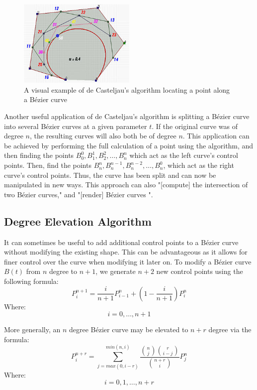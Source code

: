 \documentclass{article}
\begin{document}
\begin{figure}[h]
    \centering
    \includegraphics[width=0.5\textwidth]{de-casteljau.jpg}
    \caption{A visual example of de Casteljau's algorithm locating a point along a Bézier curve}
    \label{fig2:de-casteljau}
\end{figure}

Another useful application of de Casteljau's algorithm is splitting a Bézier curve into several Bézier curves at a given parameter $t$. If the original curve was of degree $n$, the resulting curves will also both be of degree $n$. This application can be achieved by performing the full calculation of a point using the algorithm, and then finding the points $B_0^0, B_1^1, B_2^2, \dots, B_n^n$ which act as the left curve's control points. Then, find the points $B_n^n, B_n^{n-1}, B_n^{n-2}, \dots, B_n^0$\cite{pat-mae-cho09}, which act as the right curve's control points.\cite{shene11} Thus, the curve has been split and can now be manipulated in new ways. This approach can also "[compute] the intersection of two Bézier curves," and "[render] Bézier curves
".\cite{shene11}

\subsection{Degree Elevation Algorithm}
It can sometimes be useful to add additional control points to a Bézier curve without modifying the existing shape. This can be advantageous as it allows for finer control over the curve when modifying it later on. To modify a Bézier curve $B(t)$ from $n$ degree to $n+1$, we generate $n+2$ new control points using the following formula: $$P_i^{n+1} = \frac{i}{n+1}P_{i-1}^n+(1-\frac{i}{n+1})P_i^n$$ Where: $$i=0,\dots,n+1$$
\cite{pat-mae-cho09}

More generally, an $n$ degree Bézier curve may be elevated to $n+r$ degree via the formula:
$$P_i^{n+r}=\sum_{j=max(0,i-r)}^{min(n,i)}\frac{\binom{n}{j}\binom{r}{i-j}}{\binom{n+r}{i}}P_j^n$$ Where: $$i=0,1,\dots,n+r$$
\cite{pat-mae-cho09}
\end{document}
